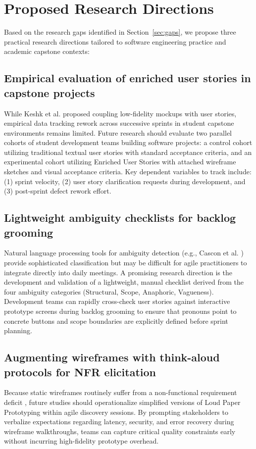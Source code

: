 \documentclass[conference]{IEEEtran}
\begin{document}
\section{Proposed Research Directions}
\label{sec:directions}

Based on the research gaps identified in Section~\ref{sec:gaps}, we propose three practical research directions tailored to software engineering practice and academic capstone contexts:

\subsection{Empirical evaluation of enriched user stories in capstone projects}
While Keshk et al. \cite{acm2022proposal} proposed coupling low-fidelity mockups with user stories, empirical data tracking rework across successive sprints in student capstone environments remains limited. Future research should evaluate two parallel cohorts of student development teams building software projects: a control cohort utilizing traditional textual user stories with standard acceptance criteria, and an experimental cohort utilizing Enriched User Stories with attached wireframe sketches and visual acceptance criteria. Key dependent variables to track include: (1) sprint velocity, (2) user story clarification requests during development, and (3) post-sprint defect rework effort.

\subsection{Lightweight ambiguity checklists for backlog grooming}
Natural language processing tools for ambiguity detection (e.g., Cascon et al. \cite{cascon2025ambiguity}) provide sophisticated classification but may be difficult for agile practitioners to integrate directly into daily meetings. A promising research direction is the development and validation of a lightweight, manual checklist derived from the four ambiguity categories (Structural, Scope, Anaphoric, Vagueness). Development teams can rapidly cross-check user stories against interactive prototype screens during backlog grooming to ensure that pronouns point to concrete buttons and scope boundaries are explicitly defined before sprint planning.

\subsection{Augmenting wireframes with think-aloud protocols for NFR elicitation}
Because static wireframes routinely suffer from a non-functional requirement deficit \cite{rueda2020requirements}, future studies should operationalize simplified versions of Loud Paper Prototyping \cite{abad2018loud} within agile discovery sessions. By prompting stakeholders to verbalize expectations regarding latency, security, and error recovery during wireframe walkthroughs, teams can capture critical quality constraints early without incurring high-fidelity prototype overhead.
\end{document}
